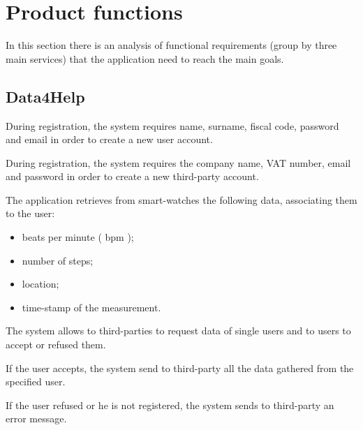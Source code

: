 \section{Product functions}

In this section there is an analysis of functional requirements (group by three main services) that the application need to reach the main goals. 



\subsection{Data4Help}
\begin{enumerate}[label={[}R1.\arabic*{]}]

    \item During registration, the system requires name, surname, fiscal code, password and email in order to create a new user account.
    \newline
    \item During registration, the system requires the company name, VAT number, email and password in order to create a new third-party account.
    
    \item The application retrieves from smart-watches the following data, associating them to the user: 
    \begin{itemize}
        \item beats per minute ( bpm );
        \item number of steps;
        \item location;
        \item time-stamp of the measurement.
    \end{itemize}
    
    \item The system allows to third-parties to request data of single users and to users to accept or refused them. 
    \begin{enumerate}[label={[}R1.\arabic{enumi}.\arabic*{]}, leftmargin=*]
        \item If the user accepts, the system send to third-party all the data gathered from the specified user.
    
        \item If the user refused or he is not registered, the system sends to third-party an error message.
    \end{enumerate}
    

\end{enumerate}
